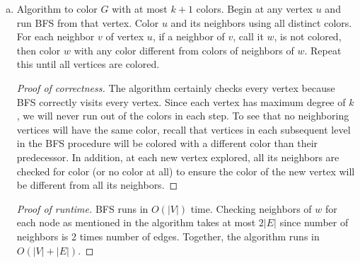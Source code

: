 \documentclass{article}
\begin{document}
\begin{enumerate}[(a)]
\begin{proof}[Proof of runtime]
BFS has $O(|V|+|E|)$ runtime; the algorithm above only add constant work of computing $d(v)-d(u)$ to BFS. Thus the algorithm also has $O(|V|+|E|)$ runtime.
\end{proof}


\item Algorithm to color $G$ with at most $k+1$ colors. Begin at any vertex $u$ and run BFS from that vertex. Color $u$ and its neighbors using all distinct colors. For each neighbor $v$ of vertex $u$, if a neighbor of $v$, call it $w$, is not colored, then color $w$ with any color different from colors of neighbors of $w$. Repeat this until all vertices are colored.
	\begin{proof}[Proof of correctness]
	The algorithm certainly checks every vertex because BFS correctly visits every vertex. Since each vertex has maximum degree of $k$, we will never run out of the colors in each step. To see that no neighboring vertices will have the same color, recall that vertices in each subsequent level in the BFS procedure will be colored with a different color than their predecessor. In addition, at each new vertex explored, all its neighbors are checked for color (or no color at all) to ensure the color of the new vertex will be different from all its neighbors.
	\end{proof}
	
	\begin{proof}[Proof of runtime]
	BFS runs in $O(|V|)$ time. Checking neighbors of $w$ for each node as mentioned in the algorithm takes at most $2|E|$ since number of neighbors is 2 times number of edges. Together, the algorithm runs in $O(|V|+|E|)$.
	\end{proof}
\end{enumerate}
\end{document}
